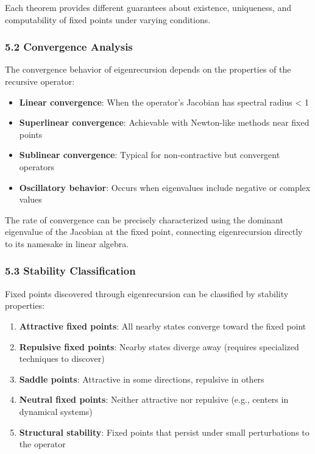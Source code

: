 \documentclass[
]{article}
\providecommand{\tightlist}{%
  \setlength{\itemsep}{0pt}\setlength{\parskip}{0pt}}
\begin{document}
Each theorem provides different guarantees about existence, uniqueness,
and computability of fixed points under varying conditions.

\subsubsection{5.2 Convergence Analysis}\label{convergence-analysis}

The convergence behavior of eigenrecursion depends on the properties of
the recursive operator:

\begin{itemize}
\tightlist
\item
  \textbf{Linear convergence}: When the operator's Jacobian has spectral
  radius \textless{} 1
\item
  \textbf{Superlinear convergence}: Achievable with Newton-like methods
  near fixed points
\item
  \textbf{Sublinear convergence}: Typical for non-contractive but
  convergent operators
\item
  \textbf{Oscillatory behavior}: Occurs when eigenvalues include
  negative or complex values
\end{itemize}

The rate of convergence can be precisely characterized using the
dominant eigenvalue of the Jacobian at the fixed point, connecting
eigenrecursion directly to its namesake in linear algebra.

\subsubsection{5.3 Stability
Classification}\label{stability-classification}

Fixed points discovered through eigenrecursion can be classified by
stability properties:

\begin{enumerate}
\def\labelenumi{\arabic{enumi}.}
\tightlist
\item
  \textbf{Attractive fixed points}: All nearby states converge toward
  the fixed point
\item
  \textbf{Repulsive fixed points}: Nearby states diverge away (requires
  specialized techniques to discover)
\item
  \textbf{Saddle points}: Attractive in some directions, repulsive in
  others
\item
  \textbf{Neutral fixed points}: Neither attractive nor repulsive (e.g.,
  centers in dynamical systems)
\item
  \textbf{Structural stability}: Fixed points that persist under small
  perturbations to the operator
\end{enumerate}
\end{document}
